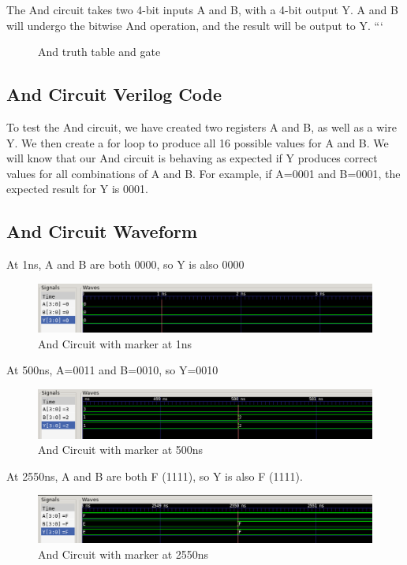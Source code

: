 \documentclass[12pt]{article}
\begin{document}
The And circuit takes two 4-bit inputs A and B, with a 4-bit output Y. A and B will undergo the bitwise And operation, and the result will be output to Y.
```\begin{figure}[H]
    \centering
    \caption{And truth table and gate}
    \label{fig:shift-table}
\end{figure}
\subsection{And Circuit Verilog Code} 
 

To test the And circuit, we have created two registers A and B, as well as a wire Y. We then create a for loop to produce all 16 possible values for A and B. We will know that our And circuit is behaving as expected if Y produces correct values for all combinations of A and B. For example, if A=0001 and B=0001, the expected result for Y is 0001. 
 

\subsection{And Circuit Waveform} 

At 1ns, A and B are both 0000, so Y is also 0000
\begin{figure}[H]
 \centering
 \includegraphics[width = 1.0\textwidth]{And/and_wave.png}
 \caption{And Circuit with marker at 1ns}
 \label{fig:enter-label} 
\end{figure} 

At 500ns, A=0011 and B=0010, so Y=0010
 \begin{figure}[H]
 \centering 
\includegraphics[width = 1.0\textwidth]{And/and_wave1.png}
 \caption{And Circuit with marker at 500ns}
 \label{fig:enter-label}
 \end{figure}

At 2550ns, A and B are both F (1111), so Y is also F (1111).
 \begin{figure}[H]
 \centering 
\includegraphics[width = 1.0\textwidth]{And/and_wave2.png}
 \caption{And Circuit with marker at 2550ns}
 \label{fig:enter-label}
 \end{figure}
\end{document}
